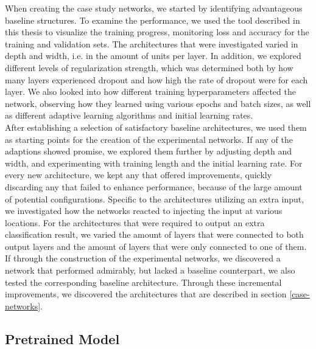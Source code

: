 When creating the case study networks, we started by identifying advantageous baseline structures. To examine the performance, we used the tool described in this thesis to visualize the training progress, monitoring loss and accuracy for the training and validation sets. The architectures that were investigated varied in depth and width, i.e. in the amount of units per layer. In addition, we explored different levels of regularization strength, which was determined both by how many layers experienced dropout and how high the rate of dropout were for each layer. We also looked into how different training hyperparameters affected the network, observing how they learned using various epochs and batch sizes, as well as different adaptive learning algorithms and initial learning rates. \\

\noindent After establishing a selection of satisfactory baseline architectures, we used them as starting points for the creation of the experimental networks. If any of the adaptions showed promise, we explored them further by adjusting depth and width, and experimenting with training length and the initial learning rate. For every new architecture, we kept any that offered improvements, quickly discarding any that failed to enhance performance, because of the large amount of potential configurations. Specific to the architectures utilizing an extra input, we investigated how the networks reacted to injecting the input at various locations. For the architectures that were required to output an extra classification result, we varied the amount of layers that were connected to both output layers and the amount of layers that were only connected to one of them. If through the construction of the experimental networks, we discovered a network that performed admirably, but lacked a baseline counterpart, we also tested the corresponding baseline architecture. Through these incremental improvements, we discovered the architectures that are described in section \ref{case-networks}. 

\subsection{Pretrained Model}


